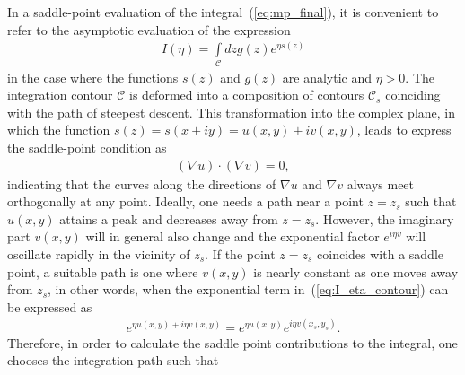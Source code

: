In a saddle-point evaluation of the integral~(\ref{eq:mp_final}), it
is convenient to refer to the asymptotic evaluation of the expression
%
\begin{eqnarray}
  \label{eq:I_eta_contour}
  I(\eta) = \int\limits_{\mathcal{C}} dz g(z) e^{\eta s(z)}
\end{eqnarray}
%
in the case where the functions $s(z)$ and $g(z)$ are analytic and
$\eta > 0$. The integration contour $\mathcal{C}$ is deformed into a
composition of contours $\mathcal{C}_{s}$ coinciding with the path of
steepest descent. This transformation into the complex plane, in which
the function $s(z) = s(x + iy) = u(x,y) + iv(x, y)$, leads to express
the saddle-point condition as
\begin{eqnarray}
  \label{eq:sp_uv_complex}
  (\nabla u) \cdot (\nabla v) = 0,
\end{eqnarray}
indicating that the curves along the directions of $\nabla u$ and
$\nabla v$ always meet orthogonally at any point. Ideally, one needs a
path near a point $z = z_{s}$ such that $u(x,y)$ attains a peak and
decreases away from $z = z_{s}$. However, the imaginary part $v(x,y)$
will in general also change and the exponential factor $e^{i\eta v}$
will oscillate rapidly in the vicinity of $z_{s}$. If the point $z =
z_{s}$ coincides with a saddle point, a suitable path is one where
$v(x,y)$ is nearly constant as one moves away from $z_{s}$, in other
words, when the exponential term in~(\ref{eq:I_eta_contour}) can be
expressed as~\cite{phd_Kopold}
%
\begin{eqnarray}
  \label{eq:exp_steepest}
  e^{\eta u(x,y) + i \eta v(x,y)} = e^{\eta u(x,y)} e^{i \eta v(x_{s},y_{s})}.
\end{eqnarray}
%
Therefore, in order to calculate the saddle point contributions to the
integral, one chooses the integration path such that
